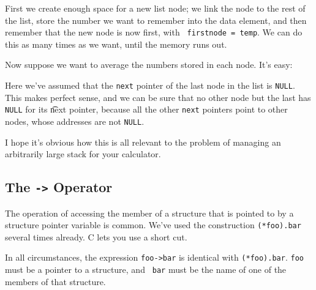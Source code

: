 First we create enough space for a new list node; we link the node to
the rest of the list, store the number we want to remember into the data
element, and then remember that the new node is now first, with {\tt
firstnode = temp}.  We can do this as many times as we want, until the
memory runs out.  

Now suppose we want to average the numbers stored in each node.  It's
easy:

\begin{flushleft}
\verb% struct listnode *current;%  \\*
\verb% int average;%  \\*
\verb% long int sum = 0L;%  \\*
\verb% int nodecount = 0;%  \\*
\verb% %  \\*
\verb% for (listnode = firstnode; % \*
\verb%      listnode != NULL; %  \\*
\verb%      listnode = (*listnode).next) {%  \\*
\verb%   sum += (*listnode).data; %  \\*
\verb%   nodecount += 1;%  \\*
\verb% }%  \\*
\verb% %  \\*
\verb% average = sum / nodecount;%  \\*
\end{flushleft}

Here we've assumed that the {\tt next} pointer of the last node in the
list is {\tt NULL}.  This makes perfect sense, and we can be sure that
no other node but the last has {\tt NULL} for its {\t next} pointer,
because all the other {\tt next} pointers point to other nodes, whose
addresses are not {\tt NULL}. 

I hope it's obvious how this is all relevant to the problem of managing
an arbitrarily large stack for your calculator.  

\subsection{The {\tt ->} Operator}

The operation of accessing the member of a structure that is pointed to
by a structure pointer variable is common.  We've used the construction
{\tt (*foo).bar} several times already.  C lets you use a short cut.

In all circumstances, the expression {\tt foo->bar} is identical with
{\tt (*foo).bar}.  {\tt foo} must be a pointer to a structure, and {\tt
bar} must be the name of one of the members of that structure.  




